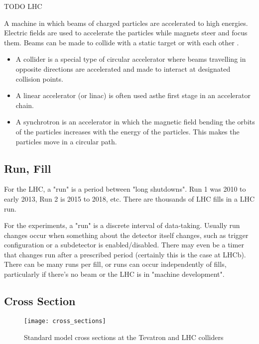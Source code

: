 TODO LHC

A machine in which beams of charged particles are accelerated to high energies. Electric fields are used to accelerate the particles while magnets steer and focus them. Beams can be made to collide with a static target or with each other \cite{CERNGlossary}.

\begin{itemize}

\item A collider is a special type of circular accelerator where beams travelling in opposite directions are accelerated and made to interact at designated collision points.

\item A linear accelerator (or linac) is often used asthe first stage in an accelerator chain.

\item A synchrotron is an accelerator in which the magnetic field bending the orbits of the particles increases with the energy of the particles. This makes the particles move in a circular path.

\end{itemize}

\subsection{Run, Fill}

For the LHC, a "run" is a period between "long shutdowns". Run 1 was 2010 to early 2013, Run 2 is 2015 to 2018, etc. There are thousands of LHC fills in a LHC run.

For the experiments, a "run" is a discrete interval of data-taking. Usually run changes occur when something about the detector itself changes, such as trigger configuration or a subdetector is enabled/disabled. There may even be a timer that changes run after a prescribed period (certainly this is the case at LHCb). There can be many runs per fill, or runs can occur independently of fills, particularly if there's no beam or the LHC is in "machine development".

\subsection{Cross Section}

\begin{figure}

	\centerline{
		\texttt{[image: cross\_sections]}}
	\caption{Standard  model  cross  sections  at  the  Tevatron  and  LHC  colliders\cite{Bechtel:2009zza}}
	\label{fig:cross_sections}
\end{figure}

